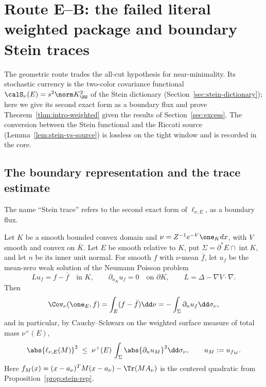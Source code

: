 \documentclass[../../main.tex]{subfiles}
\begin{document}
\section{Route E--B: the failed literal weighted package and boundary Stein traces}
\label{sec:stein}

The geometric route trades the all-cut hypothesis for near-minimality. Its stochastic currency
is the two-color covariance functional $\calS_\nu(E)=s^2\norm K_\HS^2$ of the Stein dictionary
(Section~\ref{sec:stein-dictionary}); here we give its second exact form as a boundary flux and
prove Theorem~\ref{thm:intro-weighted} given the results of Section~\ref{sec:excess}. The
conversion between the Stein functional and the Riccati source
(Lemma~\ref{lem:stein-vs-source}) is lossless on the tight window and is recorded in the core.

\subsection{The boundary representation and the trace estimate}

The name ``Stein trace'' refers to the second exact form of $\ell_{\nu,E}$, as a boundary flux.

\begin{lemma}
\label{lem:boundary-rep}
Let $K$ be a smooth bounded convex domain and
$\nu=Z^{-1}e^{-V}\one_Kdx$, with $V$ smooth and convex on $\overline K$. Let $E$ be smooth
relative to $K$, put $\Sigma=\partial^*E\cap\operatorname{int}K$, and let $n$ be its inner unit
normal. For smooth $f$ with $\nu$-mean $\bar f$, let $u_f$ be the mean-zero weak solution of the
Neumann Poisson problem
\[
 Lu_f=f-\bar f\quad\text{in }K,
 \qquad \partial_{n_K}u_f=0\quad\text{on }\partial K,
 \qquad L=\Delta-\nabla V\cdot\nabla .
\]
Then
\begin{equation}\label{eq:boundary-rep}
  \Cov_\nu(\one_E,f)
  =\int_E(f-\bar f)\dd\nu
  =-\int_\Sigma \partial_nu_f\dd\sigma_\nu ,
\end{equation}
and in particular, by Cauchy--Schwarz on the weighted surface measure of total mass $\nu^+(E)$,
\begin{equation}\label{eq:trace-CS}
  \abs{\ell_{\nu,E}(M)}^2
  \;\le\;\nu^+(E)\,\int_\Sigma\abs{\partial_nu_{M}}^2\dd\sigma_\nu ,
  \qquad u_M:=u_{f_M} .
\end{equation}
Here $f_M(x)=(x-a_\nu)^TM(x-a_\nu)-\Tr(MA_\nu)$ is the centered quadratic from
Proposition~\ref{prop:stein-rep}.
\end{lemma}
\end{document}
